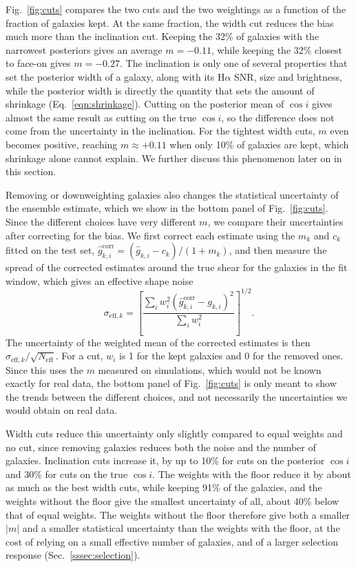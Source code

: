 Fig.~\ref{fig:cuts} compares the two cuts and the two weightings as a function of the fraction of galaxies kept. At the same fraction, the width cut reduces the bias much more than the inclination cut. Keeping the 32\% of galaxies with the narrowest posteriors gives an average $m = -0.11$, while keeping the 32\% closest to face-on gives $m = -0.27$. The inclination is only one of several properties that set the posterior width of a galaxy, along with its H$\alpha$ SNR, size and brightness, while the posterior width is directly the quantity that sets the amount of shrinkage (Eq.~\ref{eqn:shrinkage}). Cutting on the posterior mean of $\cos i$ gives almost the same result as cutting on the true $\cos i$, so the difference does not come from the uncertainty in the inclination. For the tightest width cuts, $m$ even becomes positive, reaching $m \approx +0.11$ when only 10\% of galaxies are kept, which shrinkage alone cannot explain. We further discuss this phenomenon later on in this section.

Removing or downweighting galaxies also changes the statistical uncertainty of the ensemble estimate, which we show in the bottom panel of Fig.~\ref{fig:cuts}. Since the different choices have very different $m$, we compare their uncertainties after correcting for the bias. We first correct each estimate using the $m_k$ and $c_k$ fitted on the test set, $\hat{g}^\mathrm{corr}_{k,i} = (\hat{g}_{k,i} - c_k)/(1+m_k)$, and then measure the spread of the corrected estimates around the true shear for the galaxies in the fit window, which gives an effective shape noise
\begin{equation}
\label{eqn:sigma-eff}
    \sigma_{\mathrm{eff},k} = \left[\frac{\sum_i w_i^2 \left(\hat{g}^\mathrm{corr}_{k,i} - g_{k,i}\right)^2}{\sum_i w_i^2}\right]^{1/2}.
\end{equation}
The uncertainty of the weighted mean of the corrected estimates is then $\sigma_{\mathrm{eff},k}/\sqrt{N_\mathrm{eff}}$. For a cut, $w_i$ is 1 for the kept galaxies and 0 for the removed ones. Since this uses the $m$ measured on simulations, which would not be known exactly for real data, the bottom panel of Fig.~\ref{fig:cuts} is only meant to show the trends between the different choices, and not necessarily the uncertainties we would obtain on real data.

Width cuts reduce this uncertainty only slightly compared to equal weights and no cut, since removing galaxies reduces both the noise and the number of galaxies. Inclination cuts increase it, by up to 10\% for cuts on the posterior $\cos i$ and 30\% for cuts on the true $\cos i$. The weights with the floor reduce it by about as much as the best width cuts, while keeping 91\% of the galaxies, and the weights without the floor give the smallest uncertainty of all, about 40\% below that of equal weights. The weights without the floor therefore give both a smaller $|m|$ and a smaller statistical uncertainty than the weights with the floor, at the cost of relying on a small effective number of galaxies, and of a larger selection response (Sec.~\ref{sssec:selection}).

